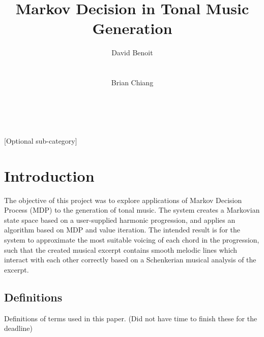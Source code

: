 \documentclass{chi2009}
\begin{document}
\setlength{\paperheight}{11in}
\setlength{\paperwidth}{8.5in}
\setlength{\pdfpageheight}{\paperheight}
\setlength{\pdfpagewidth}{\paperwidth}


\title{Markov Decision in Tonal Music Generation}
\author{
  \alignauthor David Benoit\\
    \\
    \\
  \alignauthor Brian Chiang\\
    \\
    \\
}

\maketitle

\begin{abstract}

\end{abstract}


[Optional sub-category]

\section{Introduction}

	The objective of this project was to explore applications of Markov Decision Process (MDP) to the generation of tonal music.  The system creates a Markovian state space based on a user-supplied harmonic progression, and applies an algorithm based on MDP and value iteration.  The intended result is for the system to approximate the most suitable voicing of each chord in the progression, such that the created musical excerpt contains smooth melodic lines which interact with each other correctly based on a Schenkerian musical analysis of the excerpt.

\subsection{Definitions}
Definitions of terms used in this paper.
(Did not have time to finish these for the deadline)
\end{document}

